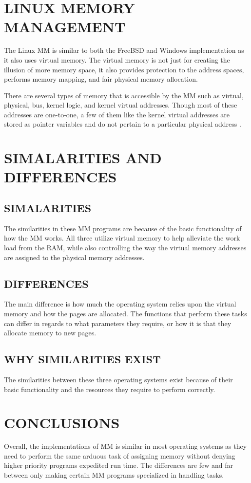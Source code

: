 \documentclass[letterpaper, 10 pt, conference]{ieeeconf}
\begin{document}
\section{LINUX MEMORY MANAGEMENT}

The Linux MM is similar to both the FreeBSD and Windows implementation as it also uses virtual memory. The virtual memory is not just for creating the illusion of more memory space, it also provides protection to the address spaces, performs memory mapping, and fair physical memory allocation.\par

There are several types of memory that is accessible by the MM such as virtual, physical, bus, kernel logic, and kernel virtual addresses. Though most of these addresses are one-to-one, a few of them like the kernel virtual addresses are stored as pointer variables and do not pertain to a particular physical address \cite{4}.
\newline

\section{SIMALARITIES AND DIFFERENCES} 
\subsection{SIMALARITIES}
The similarities in these MM programs are because of the basic functionality of how the MM works. All three utilize virtual memory to help alleviate the work load from the RAM, while also controlling the way the virtual memory addresses are assigned to the physical memory addresses. 
\newline
\subsection{DIFFERENCES}
The main difference is how much the operating system relies upon the virtual memory and how the pages are allocated. The functions that perform these tasks can differ in regards to what parameters they require, or how it is that they allocate memory to new pages.

\subsection{WHY SIMILARITIES EXIST}
The similarities between these three operating systems exist because of their basic functionality and the resources they require to perform correctly.

\section{CONCLUSIONS}

Overall, the implementations of MM is similar in most operating systems as they need to perform the same arduous task of assigning memory without denying higher priority programs expedited run time. The differences are few and far between only making certain MM programs specialized in handling tasks. 

\addtolength{\textheight}{-12cm} 


\end{document}
